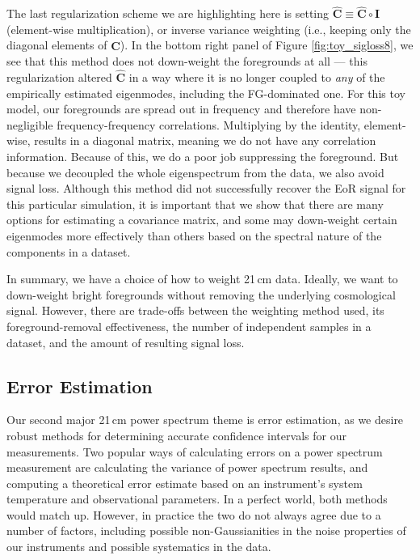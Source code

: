 \documentclass[preprint2,numberedappendix,tighten]{aastex6}  %
\begin{document}
The last regularization scheme we are highlighting here is setting $\widehat{\textbf{C}} \equiv \widehat{\textbf{C}} \circ \textbf{I}$ (element-wise multiplication), or inverse variance weighting (i.e., keeping only the diagonal elements of $\widehat{\textbf{C}}$). In the bottom right 
panel of Figure \ref{fig:toy_sigloss8}, we see that this method does not down-weight the foregrounds at all --- this regularization altered $\widehat{\textbf{C}}$ in a way where it is no longer coupled to \textit{any} of the empirically estimated eigenmodes, including the FG-dominated one. For this toy model, 
our foregrounds are spread out in frequency and therefore have non-negligible frequency-frequency correlations. Multiplying by 
the identity, element-wise, results in a diagonal matrix, meaning we do not have any correlation information. Because of this, we do a poor job 
suppressing the foreground. But because we decoupled the whole eigenspectrum from the data, we also avoid signal loss. Although this method did not successfully recover the EoR signal for this particular simulation, it is important that we show that there 
are many options for estimating a covariance matrix, and some may down-weight certain eigenmodes more effectively than others based on the spectral nature 
of the components in a dataset. 

In summary, we have a choice of how to weight 21\,cm data. Ideally, we want to down-weight bright foregrounds without 
removing the underlying cosmological signal. However, there are trade-offs between the weighting method 
used, its foreground-removal effectiveness, the number of independent samples in a dataset, and the amount of resulting signal loss. 

\color{black}


\subsection{Error Estimation}
\label{sec:ErrorOverview}

Our second major 21\,cm power spectrum theme is error estimation, as we desire robust methods for determining accurate 
confidence intervals for our measurements. Two popular ways of calculating errors on a power spectrum 
measurement are calculating the variance of power spectrum results, and computing a theoretical error estimate based on an instrument's 
system temperature and observational parameters. In a perfect world, both methods would match up. However, in practice the 
two do not always agree due to a number of factors, including possible non-Gaussianities in the noise properties of our instruments and possible systematics in the data.
\end{document}
